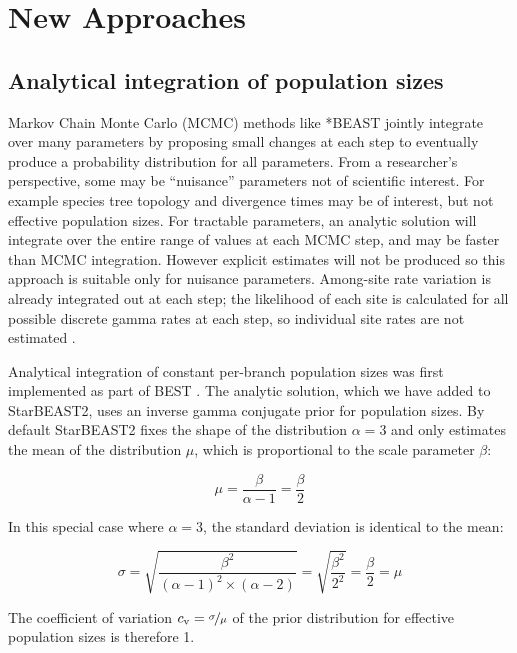 \documentclass[nogrid]{MBE}%
\begin{document}
\section{New Approaches}

\subsection{Analytical integration of population sizes}

Markov Chain Monte Carlo (MCMC) methods like *BEAST jointly integrate
over many parameters by proposing small changes at each step to eventually
produce a probability distribution for all parameters. From a
researcher's perspective, some may be ``nuisance'' parameters not of scientific
interest. For example species tree topology and divergence times may be of
interest, but not effective population sizes. For tractable parameters, an
analytic solution will integrate over the entire range of values at each MCMC
step, and may be faster than MCMC integration. However explicit
estimates will not be produced so this approach is suitable only for nuisance
parameters. Among-site rate variation is already integrated out at each step;
the likelihood of each site is calculated for all possible discrete gamma rates
at each step, so individual site rates are not estimated \citep{Yang1994}.

Analytical integration of constant per-branch population sizes was first
implemented as part of BEST \citep{EVO:EVO414}. The analytic solution, which we
have added to StarBEAST2, uses an inverse gamma conjugate prior for population
sizes. By default StarBEAST2 fixes the shape of the distribution $\alpha = 3$
and only estimates the mean of the distribution $\mu$, which is proportional to the
scale parameter $\beta$:

\begin{equation}
\mu = \frac{\beta}{\alpha - 1} = \frac{\beta}{2}
\end{equation}

In this special case where $\alpha = 3$, the standard deviation is identical to
the mean:

\begin{equation}
\sigma = \sqrt{\frac{\beta^2}{(\alpha - 1)^2 \times (\alpha - 2)}} = \sqrt{\frac{\beta^2}{2^2}} = \frac{\beta}{2} = \mu
\end{equation}

The coefficient of variation $c_\mathrm{v} = \nicefrac{\sigma}{\mu}$ of the
prior distribution for effective population sizes is therefore 1.
\end{document}
